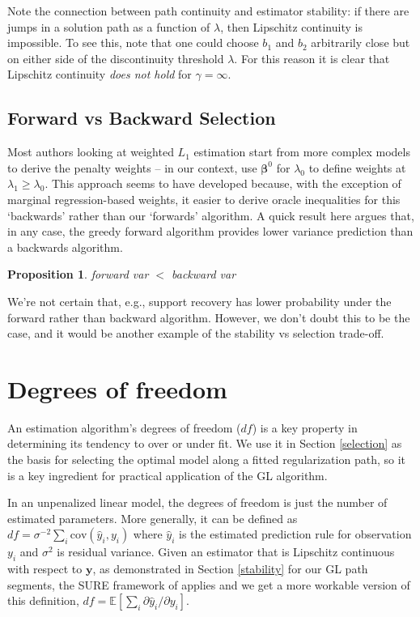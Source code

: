 \documentclass[12pt]{article}
\newtheorem{prop}{\sc Proposition}[section]
\newcommand{\bs}[1]{\boldsymbol{#1}}
\newcommand{\mr}[1]{\mathrm{#1}}
\newcommand{\bm}[1]{\mathbf{#1}}
\newcommand{\ds}[1]{\mathds{#1}}
\begin{document}
Note the connection between path continuity and estimator stability: if there
are jumps in a solution path as a function of $\lambda$, then Lipschitz
continuity is impossible. To see this, note that one could choose $b_1$ and
$b_2$ arbitrarily close but on either side of the discontinuity threshold
$\lambda$.  For this reason it is clear that Lipschitz continuity {\it does not
hold} for $\gamma =\infty$.

\subsection{Forward vs Backward Selection}

Most authors looking at weighted $L_1$ estimation start from more complex models to derive the penalty weights -- in our context, use $\bs{\beta}^0$ for $\lambda_0$ to define weights at $\lambda_1 \geq \lambda_0$.  This approach seems to have developed because, with the exception of marginal regression-based weights, it easier to derive oracle inequalities for this `backwards' rather than our `forwards' algorithm.  A quick result here argues that, in any case, the greedy forward algorithm provides lower variance prediction than a backwards algorithm.
\begin{prop}
forward var $<$ backward var
\end{prop}
We're not certain that, e.g., support recovery has lower probability under the forward rather than backward algorithm.  However, we don't doubt this to be the case, and it would be another example of the stability vs selection trade-off.

\section{Degrees of freedom}
\label{dof}

An estimation algorithm's degrees of freedom ($df$) is a key property in
determining its tendency to over or under fit.  We use it in Section
\ref{selection} as the  basis for selecting the optimal model along a
fitted regularization path, so it is a key ingredient for practical
application of the GL algorithm.  

In an unpenalized linear model, the degrees of freedom is just the number of
estimated parameters.  More generally, it can be defined as
\citep[e.g.][]{efron_least_2004} $df = \sigma^{-2} \sum_i \mr{cov}(\hat y_i,
y_i)$ where $\hat y_i$ is the estimated prediction rule for observation $y_i$
and $\sigma^2$ is residual variance. Given an estimator that is Lipschitz
continuous with respect to $\bm{y}$, as demonstrated in Section
\ref{stability} \citep[or in ][]{zou_one-step_2008} for our GL path segments,
the SURE framework of \cite{stein_estimation_1981} applies and we get a more
workable version of this definition,  $df = \ds{E}\left[\sum_i \partial \hat
y_i/\partial y_i\right]$.
\end{document}
